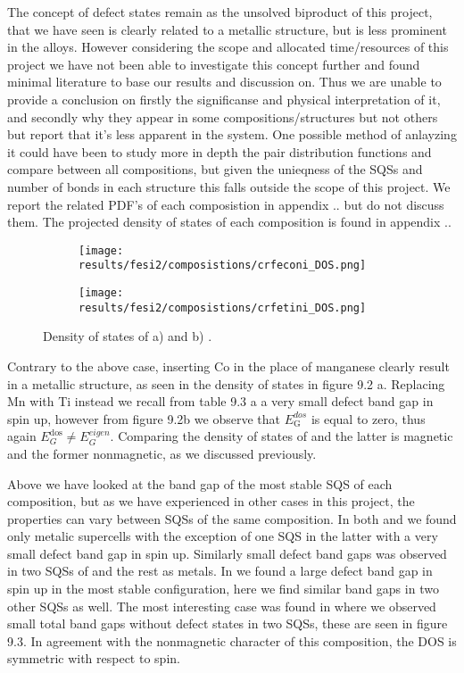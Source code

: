 The concept of defect states remain as the unsolved biproduct of this project, that we have seen is clearly related to a metallic structure, but is less prominent in the alloys. However considering the scope and allocated time/resources of this project we have not been able to investigate this concept further and found minimal literature to base our results and discussion on. Thus we are unable to provide a conclusion on firstly the significanse and physical interpretation of it, and secondly why they appear in some compositions/structures but not others but report that it's less apparent in the  system. One possible method of anlayzing it could have been to study more in depth the pair distribution functions and compare between all compositions, but given the unieqness of the SQSs and number of bonds in each structure this falls outside the scope of this project. We report the related PDF's of each composistion in appendix .. but do not discuss them. The projected density of states of each composition is found in appendix ..

\begin{figure}[H]
\begin{subfigure}{.5\textwidth}
\texttt{[image: results/fesi2/composistions/crfeconi\_DOS.png]}
\caption{}
\end{subfigure}
\begin{subfigure}{.5\textwidth}
\texttt{[image: results/fesi2/composistions/crfetini\_DOS.png]}
\caption{}
\end{subfigure}
\caption{Density of states of a)  and b) .}
\end{figure} 

Contrary to the above case, inserting Co in the place of manganese clearly result in a metallic structure, as seen in the density of states in figure 9.2 a. Replacing Mn with Ti instead we recall from table 9.3 a a very small defect band gap in spin up, however from figure 9.2b we observe that $E_\text{G}^{dos}$ is equal to zero, thus again $E_G ^\text{dos} \neq E_G ^{eigen}$. Comparing the density of states of  and  the latter is magnetic and the former nonmagnetic, as we discussed previously.

 Above we have looked at the band gap of the most stable SQS of each composition, but as we have experienced in other cases in this project, the properties can vary between SQSs of the same composition. In both  and  we found only metalic supercells with the exception of one SQS in the latter with a very small defect band gap in spin up. Similarly small defect band gaps was observed in two SQSs of  and the rest as metals. In  we found a large defect band gap in spin up in the most stable configuration, here we find similar band gaps in two other SQSs as well. The most interesting case was found in  where we observed small total band gaps without defect states in two SQSs, these are seen in figure 9.3. In agreement with the nonmagnetic character of this composition, the DOS is symmetric with respect to spin. 

